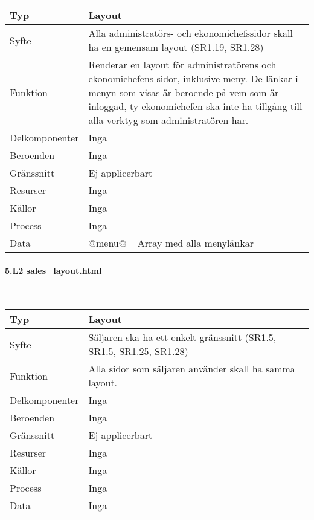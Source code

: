 \documentclass[a4paper, twoside, 11pt, titlepage]{article}
\begin{document}
			\begin {table} [ht] \begin{tabular} {  p{3.5cm} p{9.6cm} }
				\hline
				Typ & Layout  \\
				\hline
				Syfte & Alla administratörs- och ekonomichefssidor skall ha en gemensam layout (SR1.19, SR1.28)  \\
				\hline
				Funktion & Renderar en layout för administratörens och ekonomichefens sidor, inklusive meny. De länkar i menyn som visas är beroende på vem som är inloggad, ty ekonomichefen ska inte ha tillgång till alla verktyg som administratören har.  \\
				\hline
				Delkomponenter & Inga  \\
				\hline
				Beroenden & Inga  \\
				\hline
				Gränssnitt & Ej applicerbart  \\
				\hline
				Resurser & Inga  \\
				\hline
				Källor & Inga  \\
				\hline
				Process & Inga  \\
				\hline
				Data & @menu@ – Array med alla menylänkar  \\
				\hline
			\end{tabular} \end{table} \FloatBarrier


			\paragraph{5.L2 sales\_layout.html}\

			\begin {table} [ht] \begin{tabular} {  p{3.5cm} p{9.6cm} }
				\hline
				Typ & Layout  \\
				\hline
				Syfte & Säljaren ska ha ett enkelt gränssnitt (SR1.5, SR1.5, SR1.25, SR1.28)  \\
				\hline
				Funktion & Alla sidor som säljaren använder skall ha samma layout.  \\
				\hline
				Delkomponenter & Inga  \\
				\hline
				Beroenden & Inga  \\
				\hline
				Gränssnitt & Ej applicerbart  \\
				\hline
				Resurser & Inga  \\
				\hline
				Källor & Inga  \\
				\hline
				Process & Inga  \\
				\hline
				Data & Inga  \\
				\hline
			\end{tabular} \end{table} \FloatBarrier
\end{document}
